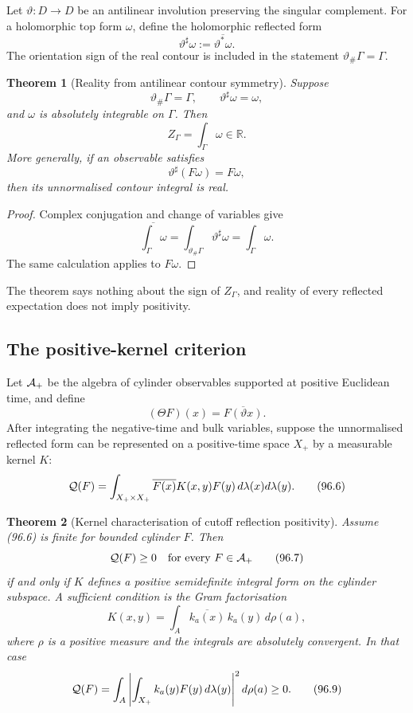 \documentclass[11pt]{article}
\newtheorem{theorem}{Theorem}[section]
\begin{document}
Let \(\vartheta:D\to D\) be an antilinear involution preserving the
singular complement.  For a holomorphic top form \(\omega\), define
the holomorphic reflected form
\[
                         \vartheta^\sharp\omega
                         :=\overline{\vartheta^*\omega}.      \tag{96.1}
\]
The orientation sign of the real contour is included in the statement
\(\vartheta_\#\Gamma=\Gamma\).

\begin{theorem}[Reality from antilinear contour symmetry]
\label{thm:v11v96-reality}
Suppose
\[
 \vartheta_\#\Gamma=\Gamma,\qquad
 \vartheta^\sharp\omega=\omega,                             \tag{96.2}
\]
and \(\omega\) is absolutely integrable on \(\Gamma\).  Then
\[
                              Z_\Gamma=\int_\Gamma\omega
                              \in\mathbb R.                  \tag{96.3}
\]
More generally, if an observable satisfies
\[
                              \vartheta^\sharp(F\omega)
                              =F\omega,                      \tag{96.4}
\]
then its unnormalised contour integral is real.
\end{theorem}

\begin{proof}
Complex conjugation and change of variables give
\[
 \overline{\int_\Gamma\omega}
 =\int_{\vartheta_\#\Gamma}\vartheta^\sharp\omega
 =\int_\Gamma\omega.
\]
The same calculation applies to \(F\omega\).
\end{proof}

The theorem says nothing about the sign of \(Z_\Gamma\), and reality
of every reflected expectation does not imply positivity.

\subsection{The positive-kernel criterion}

Let \({\cal A}_+\) be the algebra of cylinder observables supported at
positive Euclidean time, and define
\[
                         (\Theta F)(x)
                         =\overline{F(\vartheta x)}.          \tag{96.5}
\]
After integrating the negative-time and bulk variables, suppose the
unnormalised reflected form can be represented on a positive-time
space \(X_+\) by a measurable kernel \(K\):
\[
 {\cal Q}(F)
 =\int_{X_+\times X_+}
       \overline{F(x)}K(x,y)F(y)\,d\lambda(x)d\lambda(y).     \tag{96.6}
\]

\begin{theorem}[Kernel characterisation of cutoff reflection
positivity]
\label{thm:v11v96-kernel}
Assume (96.6) is finite for bounded cylinder \(F\).  Then
\[
                              {\cal Q}(F)\ge0
                         \quad\text{for every }F\in{\cal A}_+ \tag{96.7}
\]
if and only if \(K\) defines a positive semidefinite integral form on
the cylinder subspace.  A sufficient condition is the Gram
factorisation
\[
 K(x,y)=\int_A\overline{k_a(x)}\,k_a(y)\,d\rho(a),           \tag{96.8}
\]
where \(\rho\) is a positive measure and the integrals are absolutely
convergent.  In that case
\[
 {\cal Q}(F)
 =\int_A\left|
        \int_{X_+}k_a(y)F(y)\,d\lambda(y)
          \right|^2d\rho(a)\ge0.                            \tag{96.9}
\]
\end{theorem}
\end{document}
